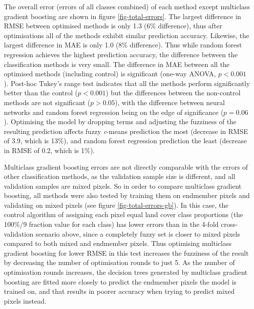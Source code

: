 \documentclass[a4paper,12pt]{scrbook}
\begin{document}
The overall error (errors of all classes combined) of each method except multiclass gradient boosting are shown in figure \ref{fig-total-errors}. The largest difference in RMSE between optimised methods is only 1.3 (6\% difference), thus after optimisations all of the methods exhibit similar prediction accuracy. Likewise, the largest difference in MAE is only 1.0 (8\% difference). Thus while random forest regression achieves the highest prediction accuracy, the difference between the classification methods is very small. The difference in MAE between all the optimised methods (including control) is significant (one-way ANOVA, $p<0.001$). Post-hoc Tukey's range test indicates that all the methods perform significantly better than the control ($p<0.001$) but the differences between the non-control methods are not significant ($p>0.05$), with the difference between neural networks and random forest regression being on the edge of significance ($p=0.06$). Optimising the model by dropping terms and adjusting the fuzziness of the resulting prediction affects fuzzy \textit{c}-means prediction the most (decrease in RMSE of 3.9, which is 13\%), and random forest regression prediction the least (decrease in RMSE of 0.2, which is 1\%).

Multiclass gradient boosting errors are not directly comparable with the errors of other classification methods, as the validation sample size is different, and all validation samples are mixed pixels. So in order to compare multiclass gradient boosting, all methods were also tested by training them on endmember pixels and validating on mixed pixels (see figure \ref{fig-total-errors-gb}). In this case, the control algorithm of assigning each pixel equal land cover class proportions (the 100\%/9 fraction value for each class) has lower errors than in the 4-fold cross-validation scenario above, since a completely fuzzy set is closer to mixed pixels compared to both mixed and endmember pixels. Thus optimising multiclass gradient boosting for lower RMSE in this test increases the fuzziness of the result by decreasing the number of optimisation rounds to just 5. As the number of optimisation rounds increases, the decision trees generated by multiclass gradient boosting are fitted more closely to predict the endmember pixels the model is trained on, and that results in poorer accuracy when trying to predict mixed pixels instead.
\end{document}
